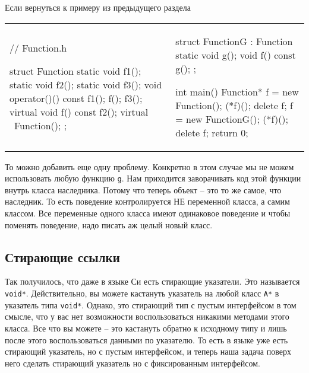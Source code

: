 Если вернуться к примеру из предыдущего раздела
\begin{center}
\begin{tabular}{ll}
{
\begin{minipage}[\baselineskip]{5cm}
\begin{cppcode}[numbers = none, linewidth=5cm]
// Function.h

struct Function {
  static void f1();
  static void f2();
  static void f3();
  void operator()() const {
    f1();
    f();
    f3();
  }
  virtual void f() const {
    f2();
  }
  virtual ~Function();
};
\end{cppcode}
\end{minipage}
}&{
\begin{minipage}[\baselineskip]{5.5cm}
\begin{cppcode}[numbers = none, linewidth=5.5cm]
struct FunctionG : Function {
  static void g();
  void f() const {
    g();
  }
};

int main() {
  Function* f = new Function();
  (*f)();
  delete f;
  f = new FunctionG();
  (*f)();
  delete f;
  return 0;
}
\end{cppcode}
\end{minipage}
}
\end{tabular}
\end{center}
То можно добавить еще одну проблему.
Конкретно в этом случае мы не можем использовать любую функцию \texttt{g}.
Нам приходится заворачивать код этой функции внутрь класса наследника.
Потому что теперь объект -- это то же самое, что наследник.
То есть поведение контролируется НЕ переменной класса, а самим классом.
Все переменные одного класса имеют одинаковое поведение и чтобы поменять поведение, надо писать аж целый новый класс.

\subsection{Стирающие ссылки}
\label{section::RefErasure}

Так получилось, что даже в языке Си есть стирающие указатели.
Это называется \texttt{void*}.
Действительно, вы можете кастануть указатель на любой класс \texttt{A*} в указатель типа \texttt{void*}.
Однако, это стирающий тип с пустым интерфейсом в том смысле, что у вас нет возможности воспользоваться никакими методами этого класса.
Все что вы можете -- это кастануть обратно к исходному типу и лишь после этого воспользоваться данными по указателю.
То есть в языке уже есть стирающий указатель, но с пустым интерфейсом, и теперь наша задача поверх него сделать стирающий указатель но с фиксированным интерфейсом.

